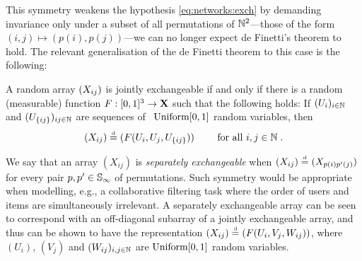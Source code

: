 This symmetry weakens the hypothesis \eqref{eq:networks:exch} by demanding invariance only under a subset of all permutations of $\mathbb{N}^2$---those of the form $(i,j)\mapsto(p(i),p(j))$---we can no longer expect de Finetti's theorem to hold.
The relevant generalisation of the de Finetti theorem to this case is the following:
\begin{thm}
  \label{theorem:ah}
  A random array $(X_{ij})$ is jointly exchangeable if and only if there is a random (measurable) function ${F:[0,1]^3\rightarrow\mathbf{X}}$ such that the following holds: If $(U_i)_{i\in\mathbb{N}}$ and $(U_{\{ij\}})_{ij\in\mathbb{N}}$ are \iid sequences of ~$\mbox{\rm Uniform}[0,1]$ random variables, then
  \begin{equation}
    \label{eq:ah}
    (X_{ij})\stackrel{\mbox{\tiny d}}{=} (F(U_i,U_j,U_{\{ij\}})) \qquad\text{ for all }i,j\in\mathbb{N}\;.
  \end{equation}
\end{thm}

\begin{rem}\label{remsep}
We say that an array $(X_{ij})$ is \emph{separately exchangeable} when $(X_{ij}) \stackrel{\mbox{\tiny d}}{=} (X_{p(i)p'(j)})$ for every pair $p,p' \in \mathbb{S}_{\infty}$ of permutations. 
Such symmetry would be appropriate when modelling, e.g., a collaborative filtering task where the order of users and items are simultaneously irrelevant.
A separately exchangeable array can be seen to correspond with an off-diagonal subarray of a jointly exchangeable array, and thus can be shown to have the representation $(X_{ij}) \stackrel{\mbox{\tiny d}}{=} (F(U_i,V_j,W_{ij}))$, where $(U_i)$, $(V_j)$ and $(W_{ij})_{i,j\in\mathbb{N}}$ are \iid $\mbox{\rm Uniform}[0,1]$ random variables.
\end{rem}


